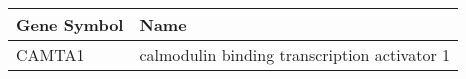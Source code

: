 \begin{tabular}{ll}
\toprule
Gene Symbol &                                         Name \\
\midrule
     CAMTA1 & calmodulin binding transcription activator 1 \\
\bottomrule
\end{tabular}

